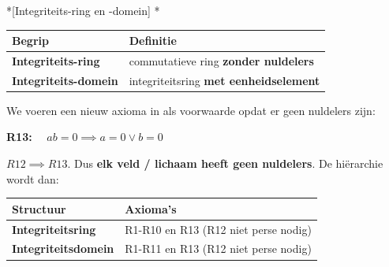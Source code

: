 \begin{nicedefinition}*[Integriteits-ring en -domein]
    \nextpart[]*
    \begin{center}
        \renewcommand{\arraystretch}{1.5}
        \begin{tabularx}{\linewidth}{@{} >{\hsize}L >{\hsize}L @{}}
            \textbf{Begrip} & \textbf{Definitie} \\
            \hline
            \textcolor{PineGreen}{\textbf{Integriteits-ring}} & commutatieve ring \textbf{zonder nuldelers}\\
            \thinrule
            \textcolor{PineGreen}{\textbf{Integriteits-domein}} & integriteitsring \textbf{met eenheidselement}\\
            \hline
        \end{tabularx}
    \end{center}
\end{nicedefinition}

We voeren een nieuw axioma in als voorwaarde opdat er geen nuldelers zijn:
\begin{center}
    \textbf{R13: }$\quad ab = 0 \implies a = 0 \lor b = 0$
\end{center}
\textbf{} $R12 \implies R13$. Dus \textbf{elk veld / lichaam heeft geen nuldelers}. De hiërarchie wordt dan:
\begin{center}
    \renewcommand{\arraystretch}{1.5}
    \begin{tabularx}{\linewidth}{@{} >{\hsize}L >{\hsize}L @{}}
        \textbf{Structuur} & \textbf{Axioma's} \\
        \hline
        \textbf{Integriteitsring} & R1-R10 en R13 (R12 niet perse nodig) \\
        \thinrule
        \textbf{Integriteitsdomein} & R1-R11 en R13 (R12 niet perse nodig)  \\
        \hline
    \end{tabularx}
\end{center}

